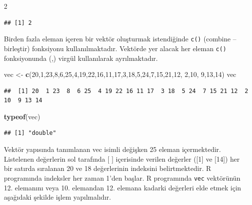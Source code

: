 \documentclass[
]{book}
\newenvironment{Shaded}{\begin{snugshade}}{\end{snugshade}}
\newcommand{\DecValTok}[1]{\textcolor[rgb]{0.00,0.00,0.81}{#1}}
\newcommand{\FunctionTok}[1]{\textcolor[rgb]{0.13,0.29,0.53}{\textbf{#1}}}
\newcommand{\NormalTok}[1]{#1}
\newcommand{\OtherTok}[1]{\textcolor[rgb]{0.56,0.35,0.01}{#1}}
\begin{document}
\begin{Shaded}
\begin{Highlighting}[]
\DecValTok{2}
\end{Highlighting}
\end{Shaded}

\begin{verbatim}
## [1] 2
\end{verbatim}

Birden fazla eleman içeren bir vektör oluşturmak istendiğinde \texttt{c()} (combine -- birleştir) fonksiyonu kullanılmaktadır. Vektörde yer alacak her eleman \texttt{c()} fonksiyonunda (,) virgül kullanılarak ayrılmaktadır.

\begin{Shaded}
\begin{Highlighting}[]
\NormalTok{vec }\OtherTok{\textless{}{-}} \FunctionTok{c}\NormalTok{(}\DecValTok{20}\NormalTok{,}\DecValTok{1}\NormalTok{,}\DecValTok{23}\NormalTok{,}\DecValTok{8}\NormalTok{,}\DecValTok{6}\NormalTok{,}\DecValTok{25}\NormalTok{,}\DecValTok{4}\NormalTok{,}\DecValTok{19}\NormalTok{,}\DecValTok{22}\NormalTok{,}\DecValTok{16}\NormalTok{,}\DecValTok{11}\NormalTok{,}\DecValTok{17}\NormalTok{,}\DecValTok{3}\NormalTok{,}\DecValTok{18}\NormalTok{,}\DecValTok{5}\NormalTok{,}\DecValTok{24}\NormalTok{,}\DecValTok{7}\NormalTok{,}\DecValTok{15}\NormalTok{,}\DecValTok{21}\NormalTok{,}\DecValTok{12}\NormalTok{, }\DecValTok{2}\NormalTok{,}\DecValTok{10}\NormalTok{, }\DecValTok{9}\NormalTok{,}\DecValTok{13}\NormalTok{,}\DecValTok{14}\NormalTok{)}
\NormalTok{vec}
\end{Highlighting}
\end{Shaded}

\begin{verbatim}
##  [1] 20  1 23  8  6 25  4 19 22 16 11 17  3 18  5 24  7 15 21 12  2 10  9 13 14
\end{verbatim}

\begin{Shaded}
\begin{Highlighting}[]
\FunctionTok{typeof}\NormalTok{(vec)}
\end{Highlighting}
\end{Shaded}

\begin{verbatim}
## [1] "double"
\end{verbatim}

Vektör yapısında tanımlanan vec isimli değişken 25 eleman içermektedir. Listelenen değerlerin sol tarafında {[} {]} içerisinde verilen değerler ({[}1{]} ve {[}14{]}) her bir satırda sıralanan 20 ve 18 değerlerinin indeksini belirtmektedir. R programında indeksler her zaman 1'den başlar. R programında \texttt{vec} vektörünün 12. elemanını veya 10. elemandan 12. elemana kadarki değerleri elde etmek için aşağıdaki şekilde işlem yapılmalıdır.
\end{document}
